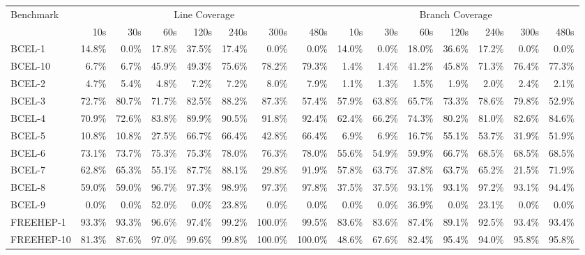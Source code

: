 \begin{tabular}{ l rrrrrrr rrrrrrr}\toprule 
 Benchmark &  \multicolumn{7}{c}{Line Coverage}  &  \multicolumn{7}{c}{Branch Coverage} \\ 
 & 10s & 30s & 60s & 120s & 240s & 300s & 480s & 10s & 30s & 60s & 120s & 240s & 300s & 480s \\ 
\midrule 
BCEL-1 &  14.8\% &  0.0\% &  17.8\% &  37.5\% &  17.4\% &  0.0\% &  0.0\% &  14.0\% &  0.0\% &  18.0\% &  36.6\% &  17.2\% &  0.0\% &  0.0\%\\ 
BCEL-10 &  6.7\% &  6.7\% &  45.9\% &  49.3\% &  75.6\% &  78.2\% &  79.3\% &  1.4\% &  1.4\% &  41.2\% &  45.8\% &  71.3\% &  76.4\% &  77.3\%\\ 
BCEL-2 &  4.7\% &  5.4\% &  4.8\% &  7.2\% &  7.2\% &  8.0\% &  7.9\% &  1.1\% &  1.3\% &  1.5\% &  1.9\% &  2.0\% &  2.4\% &  2.1\%\\ 
BCEL-3 &  72.7\% &  80.7\% &  71.7\% &  82.5\% &  88.2\% &  87.3\% &  57.4\% &  57.9\% &  63.8\% &  65.7\% &  73.3\% &  78.6\% &  79.8\% &  52.9\%\\ 
BCEL-4 &  70.9\% &  72.6\% &  83.8\% &  89.9\% &  90.5\% &  91.8\% &  92.4\% &  62.4\% &  66.2\% &  74.3\% &  80.2\% &  81.0\% &  82.6\% &  84.6\%\\ 
BCEL-5 &  10.8\% &  10.8\% &  27.5\% &  66.7\% &  66.4\% &  42.8\% &  66.4\% &  6.9\% &  6.9\% &  16.7\% &  55.1\% &  53.7\% &  31.9\% &  51.9\%\\ 
BCEL-6 &  73.1\% &  73.7\% &  75.3\% &  75.3\% &  78.0\% &  76.3\% &  78.0\% &  55.6\% &  54.9\% &  59.9\% &  66.7\% &  68.5\% &  68.5\% &  68.5\%\\ 
BCEL-7 &  62.8\% &  65.3\% &  55.1\% &  87.7\% &  88.1\% &  29.8\% &  91.9\% &  57.8\% &  63.7\% &  37.8\% &  63.7\% &  65.2\% &  21.5\% &  71.9\%\\ 
BCEL-8 &  59.0\% &  59.0\% &  96.7\% &  97.3\% &  98.9\% &  97.3\% &  97.8\% &  37.5\% &  37.5\% &  93.1\% &  93.1\% &  97.2\% &  93.1\% &  94.4\%\\ 
BCEL-9 &  0.0\% &  0.0\% &  52.0\% &  0.0\% &  23.8\% &  0.0\% &  0.0\% &  0.0\% &  0.0\% &  36.9\% &  0.0\% &  23.1\% &  0.0\% &  0.0\%\\ 
FREEHEP-1 &  93.3\% &  93.3\% &  96.6\% &  97.4\% &  99.2\% &  100.0\% &  99.5\% &  83.6\% &  83.6\% &  87.4\% &  89.1\% &  92.5\% &  93.4\% &  93.4\%\\ 
FREEHEP-10 &  81.3\% &  87.6\% &  97.0\% &  99.6\% &  99.8\% &  100.0\% &  100.0\% &  48.6\% &  67.6\% &  82.4\% &  95.4\% &  94.0\% &  95.8\% &  95.8\%\\ 

\end{tabular}
